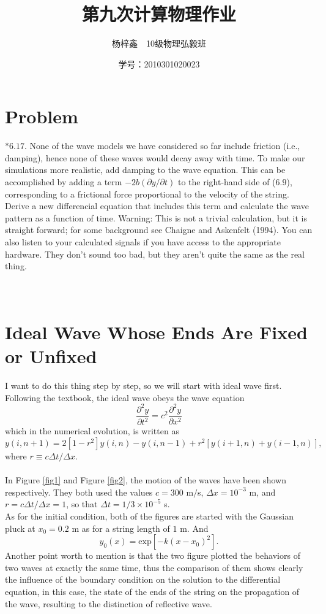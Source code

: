 \documentclass[a4paper,11pt]{article}
\author{杨梓鑫\ \ 10级物理弘毅班}
\title{第九次计算物理作业}
\date{学号：2010301020023}
\begin{document}
	\maketitle
\section{Problem}
$*\mathbf{6.17.}$ None of the wave models we have considered so far include friction (i.e., damping), hence none of these waves would decay away with time. To make our simulations more realistic, add damping to the wave equation. This can be accomplished by adding a term $-2b(\partial y / \partial t)$ to the right-hand side of (6.9), corresponding to a frictional force proportional to the velocity of the string. Derive a new differencial equation that includes this term and calculate the wave pattern as a function of time. Warning: This is not a trivial calculation, but it is straight forward; for some background see Chaigne and Askenfelt (1994). You can also listen to your calculated signals if you have access to the appropriate hardware. They don't sound too bad, but they aren't quite the same as the real thing.\\\\\\

\section{Ideal Wave Whose Ends Are Fixed or Unfixed} 
I want to do this thing step by step, so we will start with ideal wave first. Following the textbook, the ideal wave obeys the wave equation
\begin{equation}
\frac{\partial ^2 y}{\partial t^2} = c^2 \frac{\partial ^2 y}{\partial x^2}
\end{equation}
which in the numerical evolution, is written as
\begin{equation}
y(i,n+1)=2[1-r^2]y(i,n)-y(i,n-1)+r^2[y(i+1,n)+y(i-1,n)],
\end{equation}
where $r \equiv c \Delta t / \Delta x$.\\\\
In Figure \ref{fig1} and Figure \ref{fig2}, the motion of the waves have been shown respectively. They both used the values $c=300$ m$/$s, $\Delta x = 10^{-3}$ m, and $r = c \Delta t / \Delta x = 1$, so that $\Delta t = 1/3 \times 10^{-5}$ s.\\
As for the initial condition, both of the figures are started with the Gaussian pluck at $x_0 = 0.2$ m as for a string length of $1$ m. And 
\begin{equation}
y_0 (x) = \mathrm{exp}[-k(x-x_0)^2].
\end{equation}
Another point worth to mention is that the two figure plotted the behaviors of two waves at exactly the same time, thus the comparison of them shows clearly the influence of the boundary condition on the solution to the differential equation, in this case, the state of the ends of the string on the propagation of the wave, resulting to the distinction of reflective wave.
\end{document}

